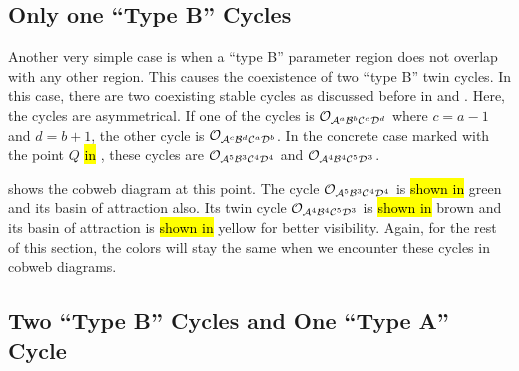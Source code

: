 \subsection{Only one ``Type B'' Cycles}

Another very simple case is when a ``type B'' parameter region does not overlap with any other region.
This causes the coexistence of two ``type B'' twin cycles.
In this case, there are two coexisting stable cycles as discussed before in  and .
Here, the cycles are asymmetrical.
If one of the cycles is $\mathcal{O}_{\mathcal{A}^a\mathcal{B}^b\mathcal{C}^c\mathcal{D}^d}$ where $c = a - 1$ and $d = b + 1$, the other cycle is $\mathcal{O}_{\mathcal{A}^c\mathcal{B}^d\mathcal{C}^a\mathcal{D}^b}$.
In the concrete case marked with the point $Q$ \hl{in} , these cycles are $\mathcal{O}_{\mathcal{A}^5\mathcal{B}^3\mathcal{C}^4\mathcal{D}^4}$ and $\mathcal{O}_{\mathcal{A}^4\mathcal{B}^4\mathcal{C}^5\mathcal{D}^3}$.

 shows the cobweb diagram at this point.
The cycle $\mathcal{O}_{\mathcal{A}^5\mathcal{B}^3\mathcal{C}^4\mathcal{D}^4}$ is \hl{shown in} green and its basin of attraction also.
Its twin cycle $\mathcal{O}_{\mathcal{A}^4\mathcal{B}^4\mathcal{C}^5\mathcal{D}^3}$ is \hl{shown in} brown and its basin of attraction is \hl{shown in} yellow for better visibility.
Again, for the rest of this section, the colors will stay the same when we encounter these cycles in cobweb diagrams.

\subsection{Two ``Type B'' Cycles and One ``Type A'' Cycle}
\label{sec:arch.coex.AB}

